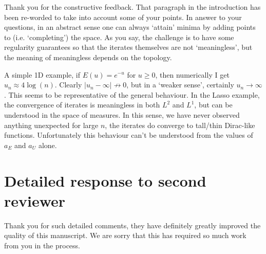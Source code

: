 \documentclass[12pt]{article}
\begin{document}
Thank you for the constructive feedback. That paragraph in the introduction has been re-worded to take into account some of your points. In answer to your questions, in an abstract sense one can always `attain' minima by adding points to (i.e. `completing') the space. As you say, the challenge is to have some regularity guarantees so that the iterates themselves are not `meaningless', but the meaning of meaningless depends on the topology. 

A simple 1D example, if $E(u) = e^{-u}$ for $u\geq0$, then numerically I get $u_n\approx 4\log(n)$. Clearly $|u_n-\infty|\not\to0$, but in a `weaker sense', certainly $u_n\to\infty$. This seems to be representative of the general behaviour. In the Lasso example, the convergence of iterates is meaningless in both $L^2$ and $L^1$, but can be understood in the space of measures. In this sense, we have never observed anything unexpected for large $n$, the iterates do converge to tall/thin Dirac-like functions. Unfortunately this behaviour can't be understood from the values of $a_E$ and $a_U$ alone.

\section{Detailed response to second reviewer}
Thank you for such detailed comments, they have definitely greatly improved the quality of this manuscript. We are sorry that this has required so much work from you in the process.
\end{document}
